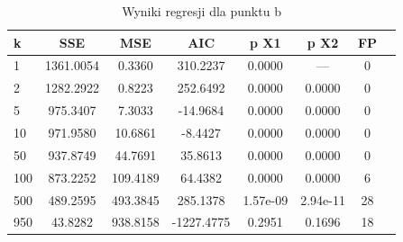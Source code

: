 \begin{table}[H]
\caption{Wyniki regresji dla punktu b}
\label{tab:zad2_b}
\begin{tabular}{lccccccc}
\toprule
k & SSE & MSE & AIC & p X1 & p X2 & FP \\
\midrule
1 & 1361.0054 & 0.3360 & 310.2237 & 0.0000 & --- & 0 \\
2 & 1282.2922 & 0.8223 & 252.6492 & 0.0000 & 0.0000 & 0 \\
5 & 975.3407 & 7.3033 & -14.9684 & 0.0000 & 0.0000 & 0 \\
10 & 971.9580 & 10.6861 & -8.4427 & 0.0000 & 0.0000 & 0 \\
50 & 937.8749 & 44.7691 & 35.8613 & 0.0000 & 0.0000 & 0 \\
100 & 873.2252 & 109.4189 & 64.4382 & 0.0000 & 0.0000 & 6 \\
500 & 489.2595 & 493.3845 & 285.1378 & 1.57e-09 & 2.94e-11 & 28 \\
950 & 43.8282 & 938.8158 & -1227.4775 & 0.2951 & 0.1696 & 18 \\
\bottomrule
\end{tabular}
\end{table}
